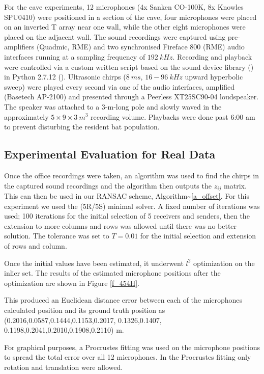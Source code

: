 \documentclass[
]{book}
\begin{document}
For the cave experiments, 12 microphones (4x Sanken CO-100K, 8x Knowles SPU0410) were positioned in a section of the cave, four microphones were placed on an inverted T array near one wall, while the other eight microphones were placed on the adjacent wall. The sound recordings were captured using pre-amplifiers (Quadmic, RME) and two synchronised Fireface 800 (RME) audio interfaces running at a sampling frequency of \(192 ~kHz\). Recording and playback were controlled via a custom written script based on the sound device library
(\cite{geier2015}) in Python 2.7.12 (\cite{van1995python}). Ultrasonic chirps (\(8~ms\), \(16-96~kHz\) upward hyperbolic sweep) were played every second via one of the audio interfaces, amplified (Basetech AP-2100) and presented through a Peerless XT25SC90-04 loudspeaker. The speaker was attached to a 3-m-long pole and slowly waved in the approximately \(5 \times 9 \times 3 ~m^3\) recording volume. Playbacks were done past 6:00 am to prevent disturbing the resident bat population.

\vspace{-5pt}
\subsection{Experimental Evaluation for Real Data}
\vspace{-5pt}

Once the office recordings were taken, an algorithm was used to find the chirps in the captured sound recordings and the algorithm then outputs the \(z_{ij}\) matrix. This can then be used in our RANSAC scheme, Algorithm\textasciitilde{}\ref{a_offset}. For this experiment we used the (5R/5S) minimal solver. A fixed number of iterations was used; 100 iterations for the initial selection of 5 receivers and senders, then the extension to more columns and rows was allowed until there was no better solution. The tolerance was set to \(T=0.01\) for the initial selection and extension of rows and column.

Once the initial values have been estimated, it underwent \(l^{2}\) optimization on the inlier set. The results of the estimated microphone positions after the optimization are shown in Figure \ref{f_454H}.

This produced an Euclidean distance error between each of the microphones calculated position and its ground truth position as (0.2016,0.0587,0.1444,0.1153,0.2017, 0.1326,0.1407, 0.1198,0.2041,0.2010,0.1908,0.2110) m.

For graphical purposes, a Procrustes fitting was used on the microphone positions to spread the total error over all 12 microphones. In the Procrustes fitting only rotation and translation were allowed.
\end{document}
